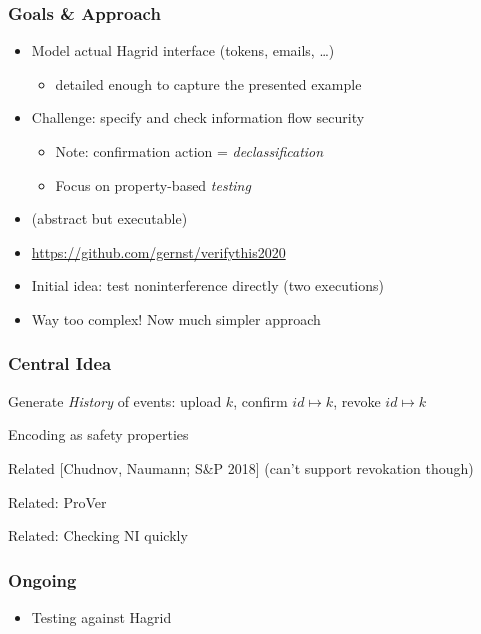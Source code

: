 \documentclass[12pt,english,dvipsnames]{beamer}
\newcommand{\red}[1]{{\color{red}#1}}
\newcommand{\green}[1]{{\color{cpacheckergreen}#1}}
\newcommand{\Yes}{\green{\cmark}}
\newcommand{\No}{\red{\xmark}}
\newcommand{\code}[1]{\text{\upshape\ttfamily#1}}
\newcommand{\id}{\mathit{id}}
\begin{document}
\begin{frame}
    \frametitle{Goals \& Approach}
    \begin{itemize}
    \item Model actual Hagrid interface (tokens, emails, \ldots) \\
        \begin{itemize}
        \item detailed enough to capture the presented example
        \end{itemize}
    \item Challenge: specify and check information flow security
        \begin{itemize}
        \item Note: confirmation action = \emph{declassification}
        \item Focus on property-based \emph{testing}
        \end{itemize}
    \item \code{Scala} (abstract but executable)
    \item \url{https://github.com/gernst/verifythis2020}
    \end{itemize}

\medskip\pause

    \begin{itemize}
    \item[\No] Initial idea: test noninterference directly (two executions)
    \item[\Yes] Way too complex! Now much simpler approach
    \end{itemize}
\end{frame}

\begin{frame}
    \frametitle{Central Idea}
    Generate \emph{History} of events:
    upload $k$, confirm $\id \mapsto k$, revoke $\id \mapsto k$

    Encoding as safety properties

    Related [Chudnov, Naumann; S\&P 2018] (can't support revokation though)

    Related: ProVer

    Related: Checking NI quickly
\end{frame}

\begin{frame}
    \frametitle{Ongoing}
    \begin{itemize}
    \item Testing against Hagrid
    \end{itemize}
\end{frame}
\end{document}
